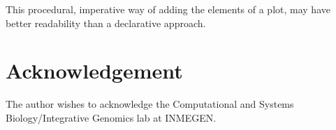 \documentclass{bioinfo}
\begin{document}
This procedural, imperative way of adding the elements of a plot, may
have better readability than a declarative approach.



\section*{Acknowledgement}
The author wishes to acknowledge the Computational and Systems
Biology/Integrative Genomics lab at INMEGEN.


%
%
%
%

\begin{thebibliography}{}


\end{thebibliography}

%
%
%
%


% 







% 
\end{document}
